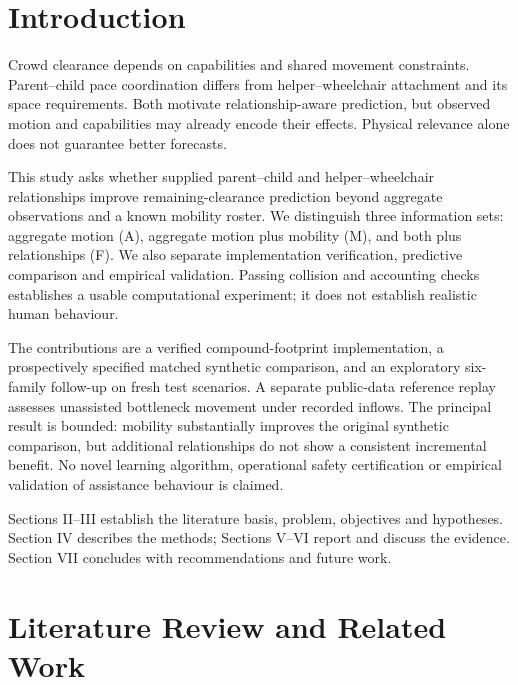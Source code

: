 \section{Introduction}
Crowd clearance depends on capabilities and shared movement constraints. Parent--child pace coordination differs from helper--wheelchair attachment and its space requirements. Both motivate relationship-aware prediction, but observed motion and capabilities may already encode their effects. Physical relevance alone does not guarantee better forecasts.

This study asks whether supplied parent--child and helper--wheelchair relationships improve remaining-clearance prediction beyond aggregate observations and a known mobility roster. We distinguish three information sets: aggregate motion (A), aggregate motion plus mobility (M), and both plus relationships (F). We also separate implementation verification, predictive comparison and empirical validation. Passing collision and accounting checks establishes a usable computational experiment; it does not establish realistic human behaviour.

The contributions are a verified compound-footprint implementation, a prospectively specified matched synthetic comparison, and an exploratory six-family follow-up on fresh test scenarios. A separate public-data reference replay assesses unassisted bottleneck movement under recorded inflows. The principal result is bounded: mobility substantially improves the original synthetic comparison, but additional relationships do not show a consistent incremental benefit. No novel learning algorithm, operational safety certification or empirical validation of assistance behaviour is claimed.

Sections II--III establish the literature basis, problem, objectives and hypotheses. Section IV describes the methods; Sections V--VI report and discuss the evidence. Section VII concludes with recommendations and future work.

\section{Literature Review and Related Work}
